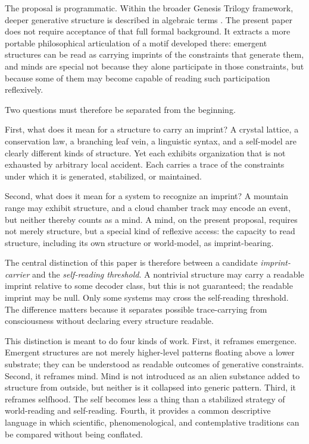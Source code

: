 \documentclass[12pt,a4paper]{article}
\begin{document}
The proposal is programmatic. Within the broader Genesis Trilogy framework, deeper generative structure is described in algebraic terms \cite{Liu2026HAFF_A,Liu2026HAFF_C,Liu2026HAFF_G}. The present paper does not require acceptance of that full formal background. It extracts a more portable philosophical articulation of a motif developed there: emergent structures can be read as carrying imprints of the constraints that generate them, and minds are special not because they alone participate in those constraints, but because some of them may become capable of reading such participation reflexively.

Two questions must therefore be separated from the beginning.

First, what does it mean for a structure to carry an imprint? A crystal lattice, a conservation law, a branching leaf vein, a linguistic syntax, and a self-model are clearly different kinds of structure. Yet each exhibits organization that is not exhausted by arbitrary local accident. Each carries a trace of the constraints under which it is generated, stabilized, or maintained.

Second, what does it mean for a system to recognize an imprint? A mountain range may exhibit structure, and a cloud chamber track may encode an event, but neither thereby counts as a mind. A mind, on the present proposal, requires not merely structure, but a special kind of reflexive access: the capacity to read structure, including its own structure or world-model, as imprint-bearing.

The central distinction of this paper is therefore between a candidate
\emph{imprint-carrier} and the \emph{self-reading threshold}. A
nontrivial structure may carry a readable imprint relative to some
decoder class, but this is not guaranteed; the readable imprint may be
null. Only some systems may cross the self-reading threshold. The
difference matters because it separates possible trace-carrying from
consciousness without declaring every structure readable.

This distinction is meant to do four kinds of work. First, it reframes emergence. Emergent structures are not merely higher-level patterns floating above a lower substrate; they can be understood as readable outcomes of generative constraints. Second, it reframes mind. Mind is not introduced as an alien substance added to structure from outside, but neither is it collapsed into generic pattern. Third, it reframes selfhood. The self becomes less a thing than a stabilized strategy of world-reading and self-reading. Fourth, it provides a common descriptive language in which scientific, phenomenological, and contemplative traditions can be compared without being conflated.
\end{document}
